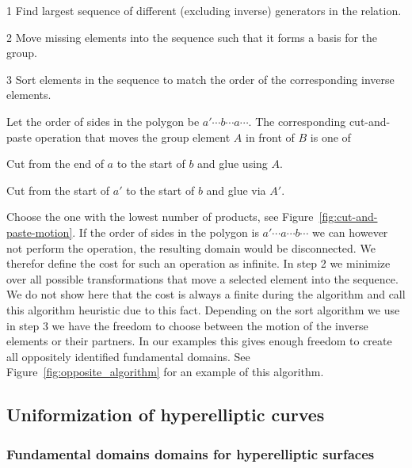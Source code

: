 \documentclass[Thesis.tex]{subfiles}
\begin{document}
  \begin{compactitem}
  \item[1] Find largest sequence of different (excluding inverse) generators in the relation.
  \item[2] Move missing elements into the sequence such that it forms a basis for the group.
  \item[3] Sort elements in the sequence to match the order of the corresponding inverse elements.
  \end{compactitem}

  Let the order of sides in the polygon be $a' \cdots b \cdots a \cdots$. The corresponding cut-and-paste operation that moves the group element $A$ in front of $B$ is one of

  \begin{compactitem}
  \item Cut from the end of $a$ to the start of $b$ and glue using $A$.
  \item Cut from the start of $a'$ to the start of $b$ and glue via $A'$.
  \end{compactitem}

  Choose the one with the lowest number of products, see Figure~\ref{fig:cut-and-paste-motion}. If the order of sides in the polygon is $a' \cdots a \cdots b \cdots$ we can however not perform the operation, the resulting domain would be disconnected. We therefor define the cost for such an operation as infinite. In step 2 we minimize over all possible transformations that move a selected element into the sequence. We do not show here that the cost is always a finite during the algorithm and call this algorithm heuristic due to this fact. Depending on the sort algorithm we use in step 3 we have the freedom to choose between the motion of the inverse elements or their partners. In our examples this gives enough freedom to create all oppositely identified fundamental domains. See Figure~\ref{fig:opposite_algorithm} for an example of this algorithm.



  \subsection{Uniformization of hyperelliptic curves}
  \label{sec:hyperelliptic}

  \subsubsection{Fundamental domains domains for hyperelliptic surfaces}
  \label{sec:hyperelliptic_domain}
\end{document}
